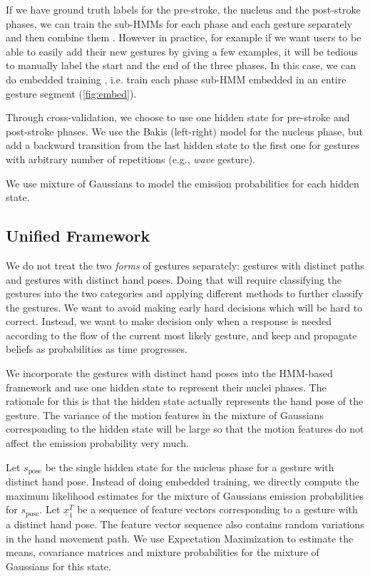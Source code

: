 \documentclass[conference]{IEEEtran}
\begin{document}
If we have ground truth labels for the pre-stroke, the nucleus and the
post-stroke phases, we can train the sub-HMMs for each phase and each gesture
separately and then combine them \cite{yin13}. However in practice, for example
if we want users to be able to easily add their new gestures by giving a few
examples, it will be tedious to manually label the start and the end of the
three phases. In this case, we can do embedded training \cite{young1994}, i.e.
train each phase sub-HMM embedded in an entire gesture segment
(\ref{fig:embed}).

Through cross-validation, we choose to use one hidden state for pre-stroke and
post-stroke phases. We use the Bakis (left-right) model \cite{Bauer00} for the
nucleus phase, but add a backward transition from the last hidden state to the first
one for gestures with arbitrary number of repetitions (e.g., \textit{wave}
gesture).

We use mixture of Gaussians to model the emission probabilities for each hidden
state. 

\subsection{Unified Framework}\label{sec:unified}
We do not treat the two \textit{forms} of gestures separately: gestures with
distinct paths and gestures with distinct hand poses. Doing that will require
classifying the gestures into the two categories and applying different methods
to further classify the gestures. We want to avoid making early hard decisions
which will be hard to correct. Instead, we want to make decision only when a
response is needed according to the flow of the current most likely gesture, and
keep and propagate beliefs as probabilities as time progresses.

We incorporate the gestures with distinct hand poses into the HMM-based
framework and use one hidden state to represent their nuclei phases. The
rationale for this is that the hidden state actually represents the hand pose of
the gesture. The variance of the motion features in the mixture of Gaussians
corresponding to the hidden state will be large so that the motion features do
not affect the emission probability very much.

Let $s_{\text{pose}}$ be the single hidden state for the nucleus phase for a
gesture with distinct hand pose. Instead of doing embedded training, we directly
compute the maximum likelihood estimates for the mixture of Gaussians emission
probabilities for $s_{\text{pose}}$. Let $\underline{x}_1^T$ be a sequence of
feature vectors corresponding to a gesture with a distinct hand pose. The
feature vector sequence also contains random variations in the hand movement
path. 
We use Expectation Maximization to estimate the means, covariance matrices and
mixture probabilities for the mixture of Gaussians for this state.
\end{document}

